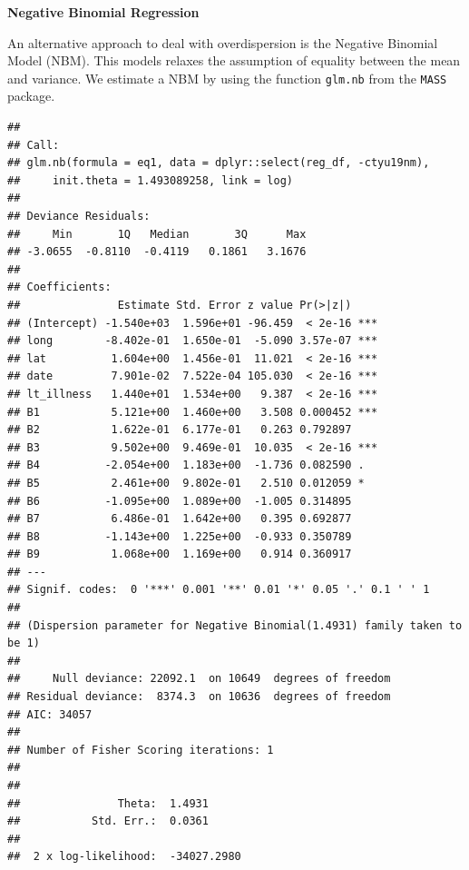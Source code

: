 \documentclass[
]{book}
\newenvironment{Shaded}{\begin{snugshade}}{\end{snugshade}}
\newcommand{\CommentTok}[1]{\textcolor[rgb]{0.56,0.35,0.01}{\textit{#1}}}
\newcommand{\DataTypeTok}[1]{\textcolor[rgb]{0.13,0.29,0.53}{#1}}
\newcommand{\KeywordTok}[1]{\textcolor[rgb]{0.13,0.29,0.53}{\textbf{#1}}}
\newcommand{\NormalTok}[1]{#1}
\newcommand{\OperatorTok}[1]{\textcolor[rgb]{0.81,0.36,0.00}{\textbf{#1}}}
\newcommand{\StringTok}[1]{\textcolor[rgb]{0.31,0.60,0.02}{#1}}
\begin{document}
\textbf{Negative Binomial Regression}

An alternative approach to deal with overdispersion is the Negative Binomial Model (NBM). This models relaxes the assumption of equality between the mean and variance. We estimate a NBM by using the function \texttt{glm.nb} from the \texttt{MASS} package.

\begin{Shaded}
\end{Shaded}

\begin{verbatim}
## 
## Call:
## glm.nb(formula = eq1, data = dplyr::select(reg_df, -ctyu19nm), 
##     init.theta = 1.493089258, link = log)
## 
## Deviance Residuals: 
##     Min       1Q   Median       3Q      Max  
## -3.0655  -0.8110  -0.4119   0.1861   3.1676  
## 
## Coefficients:
##               Estimate Std. Error z value Pr(>|z|)    
## (Intercept) -1.540e+03  1.596e+01 -96.459  < 2e-16 ***
## long        -8.402e-01  1.650e-01  -5.090 3.57e-07 ***
## lat          1.604e+00  1.456e-01  11.021  < 2e-16 ***
## date         7.901e-02  7.522e-04 105.030  < 2e-16 ***
## lt_illness   1.440e+01  1.534e+00   9.387  < 2e-16 ***
## B1           5.121e+00  1.460e+00   3.508 0.000452 ***
## B2           1.622e-01  6.177e-01   0.263 0.792897    
## B3           9.502e+00  9.469e-01  10.035  < 2e-16 ***
## B4          -2.054e+00  1.183e+00  -1.736 0.082590 .  
## B5           2.461e+00  9.802e-01   2.510 0.012059 *  
## B6          -1.095e+00  1.089e+00  -1.005 0.314895    
## B7           6.486e-01  1.642e+00   0.395 0.692877    
## B8          -1.143e+00  1.225e+00  -0.933 0.350789    
## B9           1.068e+00  1.169e+00   0.914 0.360917    
## ---
## Signif. codes:  0 '***' 0.001 '**' 0.01 '*' 0.05 '.' 0.1 ' ' 1
## 
## (Dispersion parameter for Negative Binomial(1.4931) family taken to be 1)
## 
##     Null deviance: 22092.1  on 10649  degrees of freedom
## Residual deviance:  8374.3  on 10636  degrees of freedom
## AIC: 34057
## 
## Number of Fisher Scoring iterations: 1
## 
## 
##               Theta:  1.4931 
##           Std. Err.:  0.0361 
## 
##  2 x log-likelihood:  -34027.2980
\end{verbatim}
\end{document}
